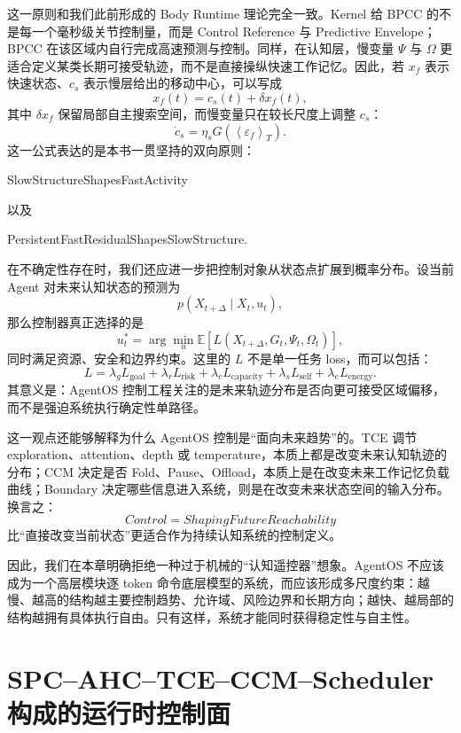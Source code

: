 这一原则和我们此前形成的 Body Runtime 理论完全一致。Kernel 给 BPCC 的不是每一个毫秒级关节控制量，而是 Control Reference 与 Predictive Envelope；BPCC 在该区域内自行完成高速预测与控制。同样，在认知层，慢变量 $\Psi$ 与 $\Omega$ 更适合定义某类长期可接受轨迹，而不是直接操纵快速工作记忆。因此，若 $x_f$ 表示快速状态、$c_s$ 表示慢层给出的移动中心，可以写成
\[
x_f(t)
=
c_s(t)
+
\delta x_f(t),
\]
其中 $\delta x_f$ 保留局部自主搜索空间，而慢变量只在较长尺度上调整 $c_s$：
\[
\dot c_s
=
\eta_s
G\left(
\left\langle
\varepsilon_f
\right\rangle_T
\right).
\]
这一公式表达的是本书一贯坚持的双向原则：
\begin{statementbox}
SlowStructureShapesFastActivity
\end{statementbox}
以及
\begin{statementbox}
PersistentFastResidualShapesSlowStructure.
\end{statementbox}

在不确定性存在时，我们还应进一步把控制对象从状态点扩展到概率分布。设当前 Agent 对未来认知状态的预测为
\[
p(
X_{t+\Delta}
\mid
X_t,u_t
),
\]
那么控制器真正选择的是
\[
u_t^\ast
=
\arg\min_{u}
\mathbb E
\left[
L(
X_{t+\Delta},
G_t,
\Psi_t,
\Omega_t
)
\right],
\]
同时满足资源、安全和边界约束。这里的 $L$ 不是单一任务 loss，而可以包括：
\[
L
=
\lambda_gL_{\mathrm{goal}}
+
\lambda_rL_{\mathrm{risk}}
+
\lambda_cL_{\mathrm{capacity}}
+
\lambda_sL_{\mathrm{self}}
+
\lambda_eL_{\mathrm{energy}}.
\]
其意义是：AgentOS 控制工程关注的是未来轨迹分布是否向更可接受区域偏移，而不是强迫系统执行确定性单路径。

这一观点还能够解释为什么 AgentOS 控制是“面向未来趋势”的。TCE 调节 exploration、attention、depth 或 temperature，本质上都是改变未来认知轨迹的分布；CCM 决定是否 Fold、Pause、Offload，本质上是在改变未来工作记忆负载曲线；Boundary 决定哪些信息进入系统，则是在改变未来状态空间的输入分布。换言之：
\[
\boxed{
Control
=
ShapingFutureReachability
}
\]
比“直接改变当前状态”更适合作为持续认知系统的控制定义。

因此，我们在本章明确拒绝一种过于机械的“认知遥控器”想象。AgentOS 不应该成为一个高层模块逐 token 命令底层模型的系统，而应该形成多尺度约束：越慢、越高的结构越主要控制趋势、允许域、风险边界和长期方向；越快、越局部的结构越拥有具体执行自由。只有这样，系统才能同时获得稳定性与自主性。

\section{SPC--AHC--TCE--CCM--Scheduler 构成的运行时控制面}

